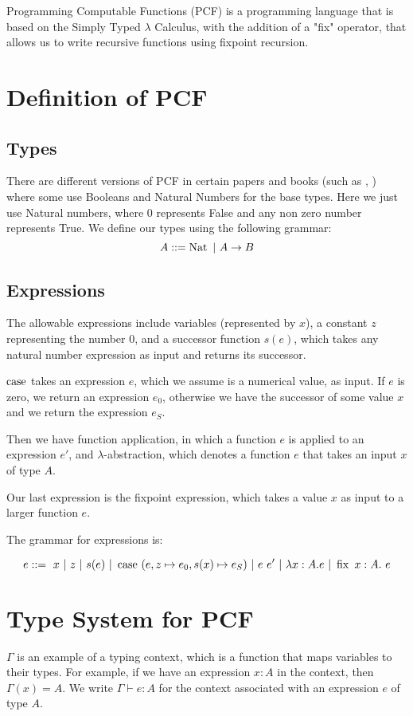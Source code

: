 Programming Computable Functions (PCF) is a programming language that is based on the Simply Typed $\lambda$ Calculus, with the addition of a "fix" operator, that allows us to write recursive functions using fixpoint recursion.

\section{Definition of PCF}

\subsection{Types}
There are different versions of PCF in certain papers and books (such as \citep{Plotkin77}, \citep{Gunter92}) where some use Booleans and Natural Numbers for the base types. Here we just use Natural numbers, where $0$ represents False and any non zero number represents True. We define our types using the following grammar:\\

\[A ::= \operatorname{Nat} \ | \  A \to B\] 

\subsection{Expressions}

The allowable expressions include variables (represented by $x$), a constant $z$ representing the number $0$, and a successor function $s(e)$, which takes any natural number expression as input and returns its successor. 

$\operatorname{case}$ takes an expression $e$, which we assume is a numerical value, as input. If $e$ is zero, we return an expression $e_0$, otherwise we have the successor of some value $x$ and we return the expression $e_S$.

Then we have function application, in which a function $e$ is applied to an expression $e'$, and $\lambda$-abstraction, which denotes a function $e$ that takes an input $x$ of type $A$.

Our last expression is the fixpoint expression, which takes a value $x$ as input to a larger function $e$.

The grammar for expressions is:

\[e ::=  \ x \ | \ z \ | \ s(e) \  |  \ \case \ (e, z \mapsto e_0 , s(x) \mapsto e_S) \ |\ e \ e' \  | \ \lambda x:A.e \ | \ \fix \ x:A . \ e\]

\section{Type System for PCF}
$\Gamma$ is an example of a typing context, which is a function that maps variables to their types. For example, if we have an expression $x : A$ in the context, then $\Gamma(x) = A$. We write $\Gamma \vdash e : A$ for the context associated with an expression $e$ of type $A$.

